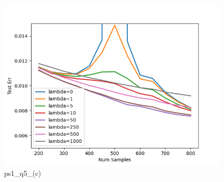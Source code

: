 
\begin{answer}
\begin{figure}
    \centering
    \includegraphics[width=0.5\linewidth]{reg.png}
    \caption{ps1\_q5_(c)}
    \label{fig:enter-label}
\end{figure}
\end{answer}
